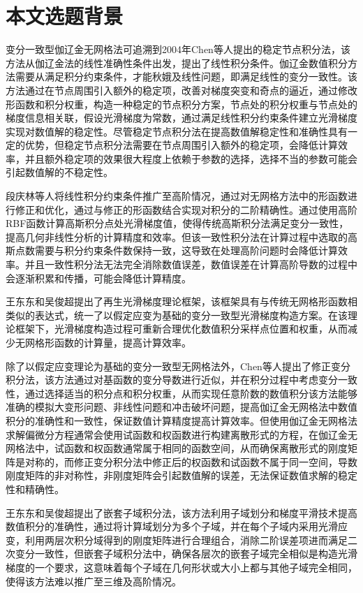 \section{本文选题背景}
变分一致型伽辽金无网格法可追溯到2004年Chen等人\textsuperscript{\cite{chen2001}}提出的稳定节点积分法，该方法从伽辽金法的线性准确性条件出发，提出了线性积分条件。伽辽金数值积分方法需要从满足积分约束条件，才能秋娥及线性问题，即满足线性的变分一致性。该方法通过在节点周围引入额外的稳定项，改善对梯度突变和奇点的逼近，通过修改形函数和积分权重，构造一种稳定的节点积分方案，节点处的积分权重与节点处的梯度信息相关联，假设光滑梯度为常数，通过满足线性积分约束条件建立光滑梯度实现对数值解的稳定性。尽管稳定节点积分法在提高数值解稳定性和准确性具有一定的优势，但稳定节点积分法需要在节点周围引入额外的稳定项，会降低计算效率，并且额外稳定项的效果很大程度上依赖于参数的选择，选择不当的参数可能会引起数值解的不稳定性。\par
段庆林等人\textsuperscript{\cite{陈嵩涛2020几何非线性分析的高效高阶无网格法,duan2012}}将线性积分约束条件推广至高阶情况，通过对无网格方法中的形函数进行修正和优化，通过与修正的形函数结合实现对积分的二阶精确性。通过使用高阶RBF函数计算高斯积分点处光滑梯度值，使得传统高斯积分法满足变分一致性，提高几何非线性分析的计算精度和效率。但该一致性积分法在计算过程中选取的高斯点数需要与积分约束条件数保持一致，这导致在处理高阶问题时会降低计算效率。并且一致性积分法无法完全消除数值误差，数值误差在计算高阶导数的过程中会逐渐积累和传播，可能会降低计算精度。\par
王东东和吴俊超提出了再生光滑梯度理论框架\textsuperscript{\cite{wang2019}}，该框架具有与传统无网格形函数相类似的表达式，统一了以假定应变为基础的变分一致型光滑梯度构造方案。在该理论框架下，光滑梯度构造过程可重新合理优化数值积分采样点位置和权重，从而减少无网格形函数的计算量，提高计算效率。\par
除了以假定应变理论为基础的变分一致型无网格法外，Chen等人\textsuperscript{\cite{chen1996}}提出了修正变分积分法，该方法通过对基函数的变分导数进行近似，并在积分过程中考虑变分一致性，通过选择适当的积分点和积分权重，从而实现任意阶数的数值积分该方法能够准确的模拟大变形问题、非线性问题和冲击破坏问题，提高伽辽金无网格法中数值积分的准确性和一致性，保证数值计算精度提高计算效率。但使用伽辽金无网格法求解偏微分方程通常会使用试函数和权函数进行构建离散形式的方程，在伽辽金无网格法中，试函数和权函数通常属于相同的函数空间，从而确保离散形式的刚度矩阵是对称的，而修正变分积分法中修正后的权函数和试函数不属于同一空间，导数刚度矩阵的非对称性，非刚度矩阵会引起数值解的误差，无法保证数值求解的稳定性和精确性。\par
王东东和吴俊超提出了嵌套子域积分法\textsuperscript{\cite{wang2016}}，该方法利用子域划分和梯度平滑技术提高数值积分的准确性，通过将计算域划分为多个子域，并在每个子域内采用光滑应变，利用两层次积分域得到的刚度矩阵进行合理组合，消除二阶误差项进而满足二次变分一致性，但嵌套子域积分法中，确保各层次的嵌套子域完全相似是构造光滑梯度的一个要求，这意味着每个子域在几何形状或大小上都与其他子域完全相同，使得该方法难以推广至三维及高阶情况。
